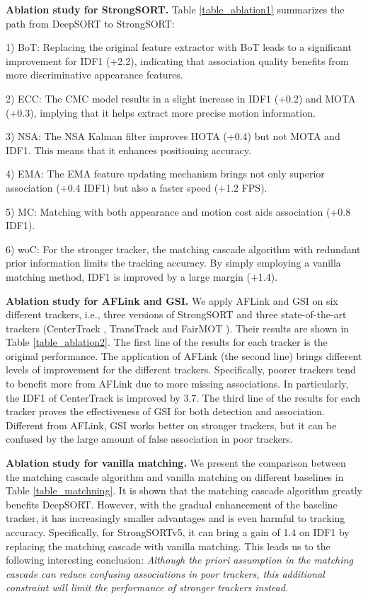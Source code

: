 \documentclass[lettersize,journal]{IEEEtran}
\begin{document}
\noindent \textbf{Ablation study for StrongSORT.}
Table \ref{table_ablation1} summarizes the path from DeepSORT to StrongSORT:

1) BoT: Replacing the original feature extractor with BoT leads to a significant improvement for IDF1 (+2.2), 
indicating that association quality benefits from more discriminative appearance features.

2) ECC: The CMC model results in a slight increase in IDF1 (+0.2) and MOTA (+0.3),
implying that it helps extract more precise motion information.

3) NSA: The NSA Kalman filter improves HOTA (+0.4) but not MOTA and IDF1.
This means that it enhances positioning accuracy.

4) EMA: The EMA feature updating mechanism brings not only superior association (+0.4 IDF1) but also a faster speed (+1.2 FPS).

5) MC: Matching with both appearance and motion cost aids association (+0.8 IDF1).

6) woC: For the stronger tracker, the matching cascade algorithm with redundant prior information limits the tracking accuracy.
By simply employing a vanilla matching method, IDF1 is improved by a large margin (+1.4).

\noindent \textbf{Ablation study for AFLink and GSI.}
We apply AFLink and GSI on six different trackers, i.e., three versions of StrongSORT 
and three state-of-the-art trackers (CenterTrack \cite{zhou2020tracking}, TransTrack \cite{sun2020transtrack} and FairMOT \cite{zhang2021fairmot}).
Their results are shown in Table \ref{table_ablation2}.
The first line of the results for each tracker is the original performance.
The application of AFLink (the second line) brings different levels of improvement for the different trackers.
Specifically, poorer trackers tend to benefit more from AFLink due to more missing associations.
In particularly, the IDF1 of CenterTrack is improved by 3.7.
The third line of the results for each tracker proves the effectiveness of GSI for both detection and association.
Different from AFLink, GSI works better on stronger trackers,
but it can be confused by the large amount of false association in poor trackers.

\noindent \textbf{Ablation study for vanilla matching.}
We present the comparison between the matching cascade algorithm and vanilla matching 
on different baselines in Table \ref{table_matchning}.
It is shown that the matching cascade algorithm greatly benefits DeepSORT.
However, with the gradual enhancement of the baseline tracker, 
it has increasingly smaller advantages and is even harmful to tracking accuracy.
Specifically, for StrongSORTv5, it can bring a gain of 1.4 on IDF1
by replacing the matching cascade with vanilla matching.
This leads us to the following interesting conclusion:
\textit{Although the priori assumption in the matching cascade can reduce confusing associations in poor trackers,
this additional constraint will limit the performance of stronger trackers instead.}
\end{document}
